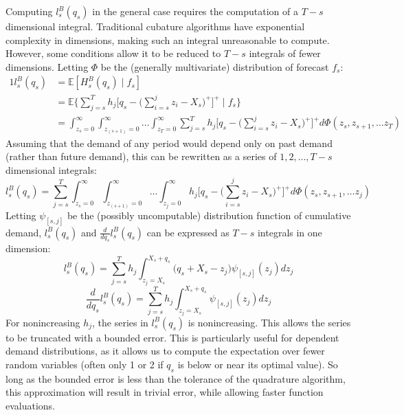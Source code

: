 \documentclass[12pt]{article}
\newcommand{\EX}{\mathbb{E}}
\begin{document}
Computing $l_s^B(q_s)$ in the general case requires the computation of a $T - s$ dimensional integral. Traditional cubature algorithms have exponential complexity in dimensions, making such an integral unreasonable to compute. However, some conditions allow it to be reduced to $T-s$ integrals of fewer dimensions. Letting $\Phi$ be the (generally multivariate) distribution of forecast $f_s$: 
\begin{alignat*}{1}
	l_s^B(q_s) &= \EX [H_s^B(q_s) \; | \; f_s] \\
        &= \EX \bigg\{\sum_{j=s}^T h_j\bigg[q_s - \bigg(\sum_{i=s}^j z_i - X_s\bigg)^+\bigg]^+  \; | \; f_s \bigg\} \\
		&= \int_{z_s=0}^{\infty} \int_{z_{(s+1)}=0}^{\infty}\dots \int_{z_T=0}^{\infty}\sum_{j=s}^T h_j\bigg[q_s - \bigg(\sum_{i=s}^j z_i - X_s\bigg)^+\bigg]^+ d\Phi(z_s, z_{s+1}, \dots z_T)
\end{alignat*}
Assuming that the demand of any period would depend only on past demand (rather than future demand), this can be rewritten as a series of $1, 2, \dots, T - s$ dimensional integrals: 
\begin{equation*}
	  l_s^B(q_s) = \sum_{j=s}^T \int_{z_s=0}^{\infty} \int_{z_{(s+1)}=0}^{\infty}\dots \int_{z_j=0}^{\infty} h_j\bigg[q_s - \bigg(\sum_{i=s}^j z_i - X_s\bigg)^+\bigg]^+ d\Phi(z_s, z_{s+1}, \dots z_j)
\end{equation*}
Letting $\psi_{[s,j]}$ be the (possibly uncomputable) distribution function of cumulative demand, $l_s^B(q_s)$ and $\frac{d}{d q_s} l_s^B(q_s)$ can be expressed as $T - s$ integrals in one dimension:
\begin{equation}
	l_s^B(q_s) = \sum_{j=s}^T  h_j \int_{z_j=X_s}^{X_s + q_s}\bigg(q_s + X_s - z_j \bigg) \psi_{[s,j]} (z_j) dz_j
\end{equation}
\begin{equation}
	\frac{d}{d q_s} l_s^B(q_s) =  \sum_{j=s}^T h_j \int_{z_j=X_s}^{X_s + q_s}  \psi_{[s,j]}(z_j) dz_j
\end{equation}
For nonincreasing $h_j$, the series in $l_s^B(q_s)$ is nonincreasing. This allows the series to be truncated with a bounded error. This is particularly useful for dependent demand distributions, as it allows us to compute the expectation over fewer random variables (often only 1 or 2 if $q_s$ is below or near its optimal value). So long as the bounded error is less than the tolerance of the quadrature algorithm, this approximation will result in trivial error, while allowing faster function evaluations.\\
\end{document}

